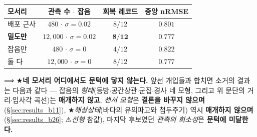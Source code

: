 \documentclass[11pt]{report}
\numberwithin{equation}{chapter}
\numberwithin{figure}{chapter}
\numberwithin{table}{chapter}
\begin{document}
\begin{center}
\begin{tabular}{lccc}
\toprule
모서리 & 관측 수 $\cdot$ 잡음 & 회복 레코드 & 중앙 nRMSE \\
\midrule
배포 근사 & $480$ $\cdot$ $\sigma{=}0.02$ & $8/12$ & $0.801$ \\
\textbf{밀도만} & $12{,}000$ $\cdot$ $\sigma{=}0.02$ & $\mathbf{8/12}$ & $0.777$ \\
잡음만 & $480$ $\cdot$ $\sigma{=}0$ & $4/12$ & $0.822$ \\
둘 다 & $12{,}000$ $\cdot$ $\sigma{=}0$ & $8/12$ & $0.777$ \\
\bottomrule
\end{tabular}
\end{center}

⟹ ★\textbf{네 모서리 어디에서도 문턱에 닿지 않는다.} 앞선 개입들과 합치면 소거의 결과는
다음과 같다 --- 잡음의 \emph{형태}(등방$\cdot$공간상관$\cdot$군집$\cdot$경사 네 모형, 그리고
위 문단의 거리$\cdot$입사각 곡선)는 \textbf{매개하지 않고}, \emph{센서 모형}은
\textbf{결론을 바꾸지 않으며}(\S\ref{sec:results_b11}),
★\emph{해상상태}(바다의 유의파고와 첨두주기) 역시 \textbf{매개하지 않으며}
(\S\ref{sec:results_b26}; ⚠\emph{선형} 참값), 마지막 후보였던 \emph{관측의
희소성}은 \textbf{문턱에 미달한다.}
\end{document}
